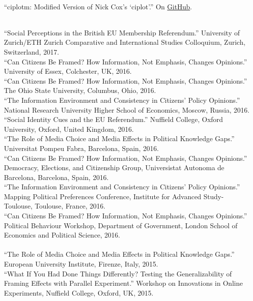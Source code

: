 \documentclass[12pt]{article}
\renewcommand{\section}[1]{\pagebreak[3]%
    \llap{\scshape\smash{\parbox[t]{\marginparwidth}{\raggedright {\color{lg}#1}}}}%
    \vspace{-\baselineskip}\par}
\newcommand{\topic}[1]{\pagebreak[3]\indent {\color{lg}{\footnotesize #1 }}\\}
\newcommand{\entry}[1]{\indent {\color{lg}\guillemotright}\hspace{2pt}#1\vspace{.25em}\\}
\begin{document}
	\topic{Stata Packages}
	\entry{``ciplotm: Modified Version of Nick Cox's `ciplot'.'' On \href{https://github.com/leeper/ciplotm}{GitHub}.}

\section{Invited\\Presentations\\\& Conference\\Papers}
	\topic{Invited Presentations (2016)}
	\entry{``Social Perceptions in the British EU Membership Referendum.'' University of Zurich/ETH Zurich Comparative and International Studies Colloquium, Zurich, Switzerland, 2017.}
	\entry{``Can Citizens Be Framed? How Information, Not Emphasis, Changes Opinions.'' University of Essex, Colchester, UK, 2016.}
	\entry{``Can Citizens Be Framed? How Information, Not Emphasis, Changes Opinions.'' The Ohio State University, Columbus, Ohio, 2016.}
	\entry{``The Information Environment and Consistency in Citizens' Policy Opinions.'' National Research University Higher School of Economics, Moscow, Russia, 2016.}
	\entry{``Social Identity Cues and the EU Referendum.'' Nuffield College, Oxford University, Oxford, United Kingdom, 2016.}
	\entry{``The Role of Media Choice and Media Effects in Political Knowledge Gaps.'' Universitat Pompeu Fabra, Barcelona, Spain, 2016.}
	\entry{``Can Citizens Be Framed? How Information, Not Emphasis, Changes Opinions.'' Democracy, Elections, and Citizenship Group, Universistat Autonoma de Barcelona, Barcelona, Spain, 2016.}
	\entry{``The Information Environment and Consistency in Citizens' Policy Opinions.'' Mapping Political Preferences Conference, Institute for Advanced Study-Toulouse, Toulouse, France, 2016.}
	\entry{``Can Citizens Be Framed? How Information, Not Emphasis, Changes Opinions.'' Political Behaviour Workshop, Department of Government, London School of Economics and Political Science, 2016.}

	\topic{Invited Presentations (2015)}
	\entry{``The Role of Media Choice and Media Effects in Political Knowledge Gaps.'' European University Institute, Firenze, Italy, 2015.}
	\entry{``What If You Had Done Things Differently? Testing the Generalizability of Framing Effects with Parallel Experiment.'' Workshop on Innovations in Online Experiments, Nuffield College, Oxford, UK, 2015.}
	
\end{document}
